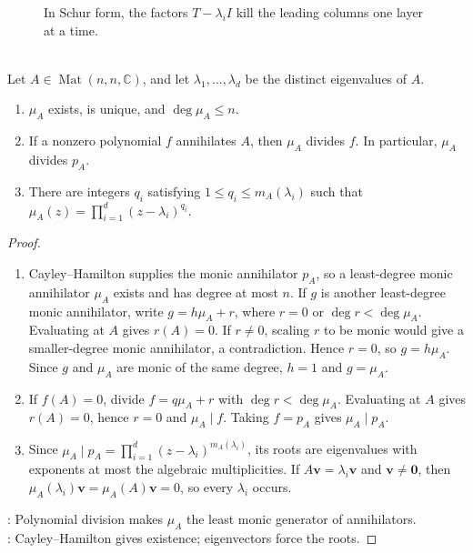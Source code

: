 \begin{figure}[H]
  \centering
  
\caption{In Schur form, the factors $T-\lambda_iI$ kill the leading columns one layer at a time.}
  \label{fig:cayley-hamilton-triangular-killing}
\end{figure}

\begin{theorem} \label{thm:minimal-polynomial-basic-properties} \\
Let $A\in\operatorname{Mat}(n,n,\mathbb{C})$, and let $\lambda_1,\ldots,\lambda_d$ be the distinct eigenvalues of $A$.
\begin{enumerate}[label=(\roman*)]
\setlength{\itemsep}{0pt}
\item $\mu_A$ exists, is unique, and $\deg\mu_A\leq n$.
\item If a nonzero polynomial $f$ annihilates $A$, then $\mu_A$ divides $f$. In particular, $\mu_A$ divides $p_A$.
\item There are integers $q_i$ satisfying $1\leq q_i\leq m_A(\lambda_i)$ such that $\mu_A(z)=\prod\limits_{i=1}^{d}(z-\lambda_i)^{q_i}$.
\end{enumerate}
\begin{proof}
\begin{enumerate}[label=(\roman*)]
\setlength{\itemsep}{0pt}
\item Cayley--Hamilton supplies the monic annihilator $p_A$, so a least-degree monic annihilator $\mu_A$ exists and has degree at most $n$. If $g$ is another least-degree monic annihilator, write $g=h\mu_A+r$, where $r=0$ or $\deg r<\deg\mu_A$. Evaluating at $A$ gives $r(A)=0$. If $r\neq0$, scaling $r$ to be monic would give a smaller-degree monic annihilator, a contradiction. Hence $r=0$, so $g=h\mu_A$.\\
Since $g$ and $\mu_A$ are monic of the same degree, $h=1$ and $g=\mu_A$.
\item If $f(A)=0$, divide $f=q\mu_A+r$ with $\deg r<\deg\mu_A$. Evaluating at $A$ gives $r(A)=0$, hence $r=0$ and $\mu_A\mid f$. Taking $f=p_A$ gives $\mu_A\mid p_A$.
\item Since $\mu_A\mid p_A=\prod_{i=1}^{d}(z-\lambda_i)^{m_A(\lambda_i)}$, its roots are eigenvalues with exponents at most the algebraic multiplicities. If $A\mathbf{v}=\lambda_i\mathbf{v}$ and $\mathbf{v}\neq\mathbf{0}$, then $\mu_A(\lambda_i)\mathbf{v}=\mu_A(A)\mathbf{v}=0$, so every $\lambda_i$ occurs.
\end{enumerate}
: Polynomial division makes $\mu_A$ the least monic generator of annihilators.\\
: Cayley--Hamilton gives existence; eigenvectors force the roots.
\end{proof}
\end{theorem}

